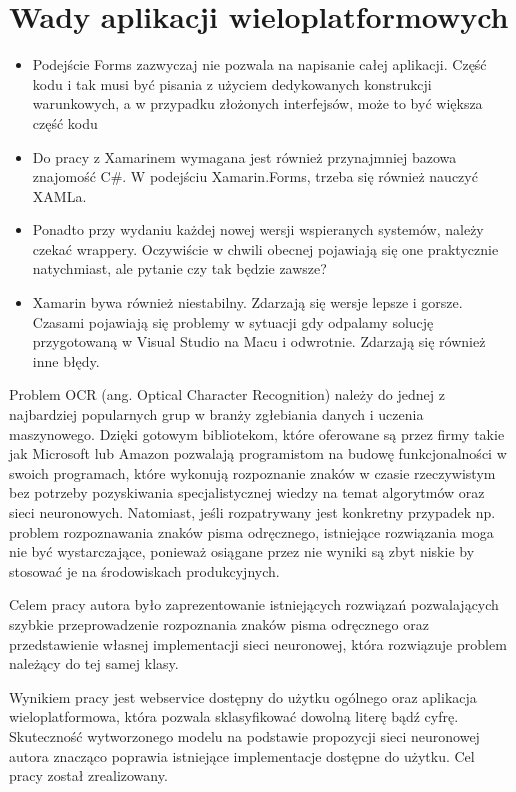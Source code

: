 \documentclass[brudnopis]{xmgr}
\begin{document}
\section{Wady aplikacji wieloplatformowych}

\begin{itemize}
\item
Podejście Forms zazwyczaj nie pozwala na napisanie całej aplikacji. Część kodu i tak musi być pisania z użyciem dedykowanych konstrukcji warunkowych, a w przypadku złożonych interfejsów, może to być większa część kodu
\item
Do pracy z Xamarinem wymagana jest również przynajmniej bazowa znajomość C\#. W podejściu Xamarin.Forms, trzeba się również nauczyć XAMLa.
\item
Ponadto przy wydaniu każdej nowej wersji wspieranych systemów, należy czekać wrappery. Oczywiście w chwili obecnej pojawiają się one praktycznie natychmiast, ale pytanie czy tak będzie zawsze?
\item
Xamarin bywa również niestabilny. Zdarzają się wersje lepsze i gorsze. Czasami pojawiają się problemy w sytuacji gdy odpalamy solucję przygotowaną w Visual Studio na Macu i odwrotnie. Zdarzają się również inne błędy.

\end{itemize}

\summary

Problem OCR (ang. Optical Character Recognition) należy do jednej z najbardziej popularnych grup w branży zgłebiania danych i uczenia maszynowego. Dzięki gotowym bibliotekom, które oferowane są przez firmy takie jak Microsoft lub Amazon pozwalają programistom na budowę funkcjonalności w swoich programach, które wykonują rozpoznanie znaków w czasie rzeczywistym bez potrzeby pozyskiwania specjalistycznej wiedzy na temat algorytmów oraz sieci neuronowych. Natomiast, jeśli rozpatrywany jest konkretny przypadek np. problem rozpoznawania znaków pisma odręcznego, istniejące rozwiązania moga nie być wystarczające, ponieważ osiągane przez nie wyniki są zbyt niskie by stosować je na środowiskach produkcyjnych.

Celem pracy autora było zaprezentowanie istniejących rozwiązań pozwalających szybkie przeprowadzenie rozpoznania znaków pisma odręcznego oraz przedstawienie własnej implementacji sieci neuronowej, która rozwiązuje problem należący do tej samej klasy. 

Wynikiem pracy jest webservice dostępny do użytku ogólnego oraz aplikacja wieloplatformowa, która pozwala sklasyfikować dowolną literę bądź cyfrę. Skuteczność wytworzonego modelu na podstawie propozycji sieci neuronowej autora znacząco poprawia istniejące implementacje dostępne do użytku. Cel pracy został zrealizowany.
\end{document}
